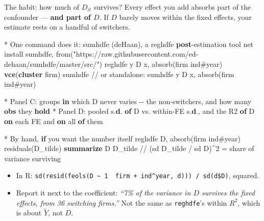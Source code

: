 \documentclass[
  11pt,
  ignorenonframetext,
  aspectratio=169,
]{beamer}
\newenvironment{Shaded}{\begin{snugshade}}{\end{snugshade}}
\newcommand{\CommentTok}[1]{\textcolor[rgb]{0.37,0.37,0.37}{#1}}
\newcommand{\FunctionTok}[1]{\textcolor[rgb]{0.28,0.35,0.67}{#1}}
\newcommand{\KeywordTok}[1]{\textcolor[rgb]{0.00,0.23,0.31}{\textbf{#1}}}
\newcommand{\NormalTok}[1]{\textcolor[rgb]{0.00,0.23,0.31}{#1}}
\newcommand{\OtherTok}[1]{\textcolor[rgb]{0.00,0.23,0.31}{#1}}
\newcommand{\StringTok}[1]{\textcolor[rgb]{0.13,0.47,0.30}{#1}}
\providecommand{\tightlist}{%
  \setlength{\itemsep}{0pt}\setlength{\parskip}{0pt}}
\begin{document}
\begin{frame}[fragile]{The habit: how much of \(D_{it}\) survives?}
\protect{}\label{the-habit-how-much-of-d_it-survives}
Every effect you add absorbs part of the confounder --- \textbf{and part
of \(D\)}. If \(D\) barely moves within the fixed effects, your estimate
rests on a handful of switchers.

\scriptsize

\begin{Shaded}
\begin{Highlighting}[]
\NormalTok{* One command does it: sumhdfe (deHaan), a reghdfe }\KeywordTok{post}\NormalTok{{-}estimation tool}
\NormalTok{net install sumhdfe, from(}\StringTok{"https://raw.githubusercontent.com/ed{-}dehaan/sumhdfe/master/src/"}\NormalTok{)}
\NormalTok{reghdfe }\FunctionTok{y}\NormalTok{ D x, absorb(firm ind\#year) }\KeywordTok{vce}\NormalTok{(}\KeywordTok{cluster}\NormalTok{ firm)}
\NormalTok{sumhdfe                          }\CommentTok{// or standalone: sumhdfe y D x, absorb(firm ind\#year)}

\NormalTok{* Panel C: groups }\KeywordTok{in}\NormalTok{ which D never varies {-}{-} the non{-}switchers, and how many }\KeywordTok{obs}\NormalTok{ they }\KeywordTok{hold}
\NormalTok{* Panel D: pooled }\FunctionTok{s}\NormalTok{.}\KeywordTok{d}\NormalTok{. }\KeywordTok{of}\NormalTok{ D vs. within{-}FE }\FunctionTok{s}\NormalTok{.}\KeywordTok{d}\NormalTok{., and the R2 }\KeywordTok{of}\NormalTok{ D }\KeywordTok{on}\NormalTok{ each FE and }\KeywordTok{on} \OtherTok{all} \KeywordTok{of}\NormalTok{ them}

\NormalTok{* By hand, }\KeywordTok{if}\NormalTok{ you want the number itself}
\NormalTok{reghdfe D, absorb(firm ind\#year) residuals(D\_tilde)}
\KeywordTok{summarize}\NormalTok{ D D\_tilde              }\CommentTok{// (sd D\_tilde / sd D)\^{}2 = share of variance surviving}
\end{Highlighting}
\end{Shaded}

\normalsize

\begin{itemize}
\tightlist
\item
  In R:
  \texttt{sd(resid(feols(D\ \textasciitilde{}\ 1\ \textbar{}\ firm\ +\ ind\^{}year,\ d)))\ /\ sd(d\$D)},
  squared.
\item
  Report it next to the coefficient: \emph{``7\% of the variance in
  \(D\) survives the fixed effects, from 36 switching firms.''} Not the
  same as \texttt{reghdfe}'s within \(R^2\), which is about
  \(\tilde Y\), not \(D\).
\end{itemize}
\end{frame}
\end{document}
